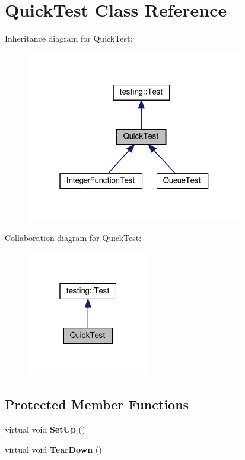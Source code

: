 \hypertarget{class_quick_test}{}\section{Quick\+Test Class Reference}
\label{class_quick_test}


Inheritance diagram for Quick\+Test\+:
\nopagebreak
\begin{figure}[H]
\begin{center}
\leavevmode
\includegraphics[width=268pt]{class_quick_test__inherit__graph}
\end{center}
\end{figure}


Collaboration diagram for Quick\+Test\+:
\nopagebreak
\begin{figure}[H]
\begin{center}
\leavevmode
\includegraphics[width=151pt]{class_quick_test__coll__graph}
\end{center}
\end{figure}
\subsection*{Protected Member Functions}
\begin{DoxyCompactItemize}
\item 
\mbox{\label{class_quick_test_ae52ad082887512b92240ce40a1a05650}} 
virtual void {\bfseries Set\+Up} ()
\item 
\mbox{\label{class_quick_test_a6b2d16cc0c69d30a16fe612db5abfc39}} 
virtual void {\bfseries Tear\+Down} ()
\end{DoxyCompactItemize}
